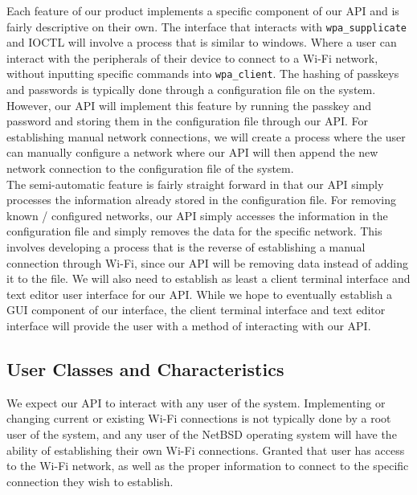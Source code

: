 Each feature of our product implements a specific component of our API and is fairly descriptive on their own. 
The interface that interacts with \texttt{wpa\_supplicate} and IOCTL will involve a process that is similar to 
windows. Where a user can interact with the peripherals of their device to connect to a Wi-Fi network, without 
inputting specific commands into \texttt{wpa\_client}. The hashing of passkeys and passwords is typically done 
through a configuration file on the system. However, our API will implement this feature by running the passkey 
and password and storing them in the configuration file through our API. For establishing manual network connections, 
we will create a process where the user can manually configure a network where our API will then append the new network 
connection to the configuration file of the system. \\
The semi-automatic feature is fairly straight forward in that our API simply processes the information already stored in the 
configuration file. For removing known / configured networks, our API simply accesses the information in the configuration file 
and simply removes the data for the specific network. This involves developing a process that is the reverse of establishing 
a manual connection through Wi-Fi, since our API will be removing data instead of adding it to the file. We will also need 
to establish as least a client terminal interface and text editor user interface for our API. While we hope to eventually 
establish a GUI component of our interface, the client terminal interface and text editor interface will provide the user with a 
method of interacting with our API.

\subsection{User Classes and Characteristics}

We expect our API to interact with any user of the system. Implementing or changing current or existing Wi-Fi connections is 
not typically done by a root user of the system, and any user of the NetBSD operating system will have the ability of 
establishing their own Wi-Fi connections. Granted that user has access to the Wi-Fi network, as well as the proper information 
to connect to the specific connection they wish to establish. 

